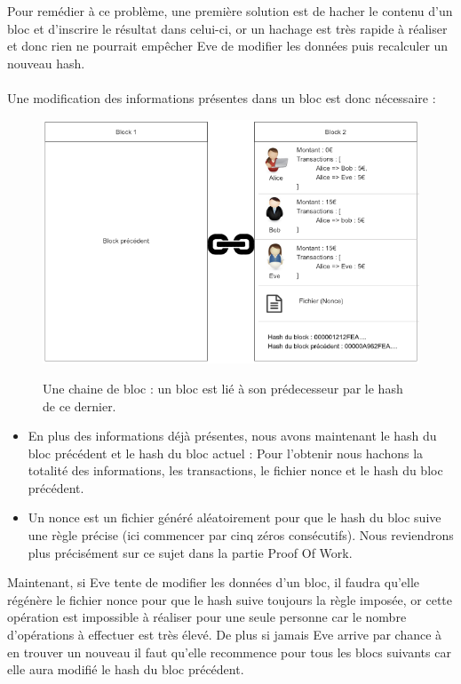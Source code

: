 \documentclass[12pt, a4paper, oneside]{book}
\begin{document}
    Pour remédier à ce problème, une première solution est de hacher le contenu d’un bloc et d’inscrire le résultat dans celui-ci, or un hachage est très rapide à réaliser et donc rien ne pourrait empêcher Eve de modifier les données puis recalculer un nouveau hash.
    \\
    \\
    Une modification des informations présentes dans un bloc est donc nécessaire :

    \begin{figure}[H]
        \begin{center}
          \includegraphics[width=.98\textwidth]{images/chaine.png}
          \label{fig:chaine}
          \caption{Une chaine de bloc : un bloc est lié à son prédecesseur par le hash de ce dernier.}
        \end{center}
    \end{figure}
    \newpage

    \begin{itemize}
        \item En plus des informations déjà présentes, nous avons maintenant le hash du bloc précédent et le hash du bloc actuel : Pour l’obtenir nous hachons la totalité des informations, les transactions, le fichier nonce et le hash du bloc précédent.
        \item Un nonce est un fichier généré aléatoirement pour que le hash du bloc suive une règle précise (ici commencer par cinq zéros consécutifs). Nous reviendrons plus précisément sur ce sujet dans la partie Proof Of Work.
    \end{itemize}


    Maintenant, si Eve tente de modifier les données d’un bloc, il faudra qu’elle régénère le fichier nonce pour que le hash suive toujours la règle imposée, or cette opération est impossible à réaliser pour une seule personne car le nombre d’opérations à effectuer est très élevé. De plus si jamais Eve arrive par chance à en trouver un nouveau il faut qu’elle recommence pour tous les blocs suivants car elle aura modifié le hash du bloc précédent.
\end{document}

